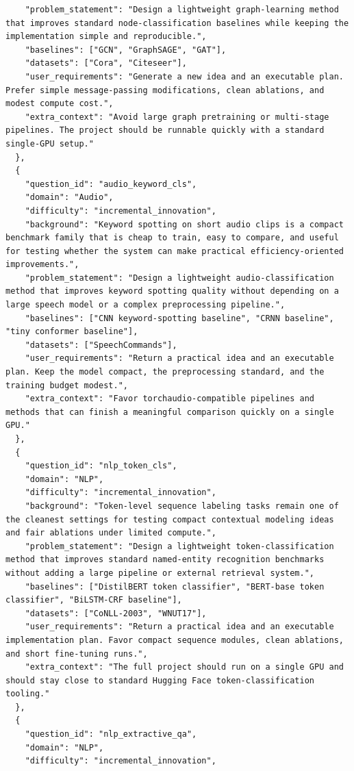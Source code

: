 \documentclass{opendatalab}
\begin{document}
\begin{lstlisting}
    "problem_statement": "Design a lightweight graph-learning method that improves standard node-classification baselines while keeping the implementation simple and reproducible.",
    "baselines": ["GCN", "GraphSAGE", "GAT"],
    "datasets": ["Cora", "Citeseer"],
    "user_requirements": "Generate a new idea and an executable plan. Prefer simple message-passing modifications, clean ablations, and modest compute cost.",
    "extra_context": "Avoid large graph pretraining or multi-stage pipelines. The project should be runnable quickly with a standard single-GPU setup."
  },
  {
    "question_id": "audio_keyword_cls",
    "domain": "Audio",
    "difficulty": "incremental_innovation",
    "background": "Keyword spotting on short audio clips is a compact benchmark family that is cheap to train, easy to compare, and useful for testing whether the system can make practical efficiency-oriented improvements.",
    "problem_statement": "Design a lightweight audio-classification method that improves keyword spotting quality without depending on a large speech model or a complex preprocessing pipeline.",
    "baselines": ["CNN keyword-spotting baseline", "CRNN baseline", "tiny conformer baseline"],
    "datasets": ["SpeechCommands"],
    "user_requirements": "Return a practical idea and an executable plan. Keep the model compact, the preprocessing standard, and the training budget modest.",
    "extra_context": "Favor torchaudio-compatible pipelines and methods that can finish a meaningful comparison quickly on a single GPU."
  },
  {
    "question_id": "nlp_token_cls",
    "domain": "NLP",
    "difficulty": "incremental_innovation",
    "background": "Token-level sequence labeling tasks remain one of the cleanest settings for testing compact contextual modeling ideas and fair ablations under limited compute.",
    "problem_statement": "Design a lightweight token-classification method that improves standard named-entity recognition benchmarks without adding a large pipeline or external retrieval system.",
    "baselines": ["DistilBERT token classifier", "BERT-base token classifier", "BiLSTM-CRF baseline"],
    "datasets": ["CoNLL-2003", "WNUT17"],
    "user_requirements": "Return a practical idea and an executable implementation plan. Favor compact sequence modules, clean ablations, and short fine-tuning runs.",
    "extra_context": "The full project should run on a single GPU and should stay close to standard Hugging Face token-classification tooling."
  },
  {
    "question_id": "nlp_extractive_qa",
    "domain": "NLP",
    "difficulty": "incremental_innovation",

\end{lstlisting}
\end{document}
